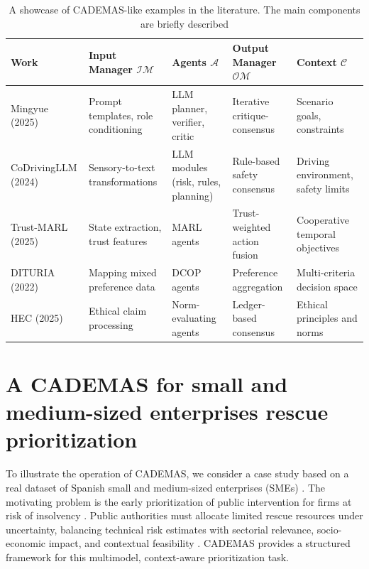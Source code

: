 \documentclass[letterpaper, 10 pt,conference]{IEEEconf}
\begin{document}
\begin{table}[h!]
\centering
\renewcommand{\arraystretch}{1.3}
\caption{A showcase of CADEMAS-like examples in the literature. The main components are briefly described}
\label{tab:cademas_mapping}
\begin{tabular}{|p{3.2cm}|p{3.2cm}|p{3.2cm}|p{3.2cm}|p{3.2cm}|}
\hline
\textbf{Work} & \textbf{Input Manager $\mathcal{IM}$} & \textbf{Agents $\mathcal{A}$} & \textbf{Output Manager $\mathcal{OM}$} & \textbf{Context $\mathcal{C}$} \\
\hline
Mingyue (2025) \cite{Cai2025} & Prompt templates, role conditioning & LLM planner, verifier, critic & Iterative critique-consensus & Scenario goals, constraints \\
\hline
CoDrivingLLM (2024) \cite{CoDrivingLLM} & Sensory-to-text transformations & LLM modules (risk, rules, planning) & Rule-based safety consensus & Driving environment, safety limits \\
\hline
Trust-MARL (2025) \cite{Trust-MARL2025} & State extraction, trust features & MARL agents & Trust-weighted action fusion & Cooperative temporal objectives \\
\hline
DITURIA (2022) \cite{dituria2022}& Mapping mixed preference data & DCOP agents & Preference aggregation & Multi-criteria decision space \\
\hline
HEC (2025) \cite{HECframework} & Ethical claim processing & Norm-evaluating agents & Ledger-based consensus & Ethical principles and norms \\
\hline
\end{tabular}
\end{table}

\section{A CADEMAS for small and medium-sized enterprises rescue prioritization\label{sect:smes}}

To illustrate the operation of CADEMAS, we consider a case study based on a real dataset of Spanish small and medium-sized enterprises (SMEs) \cite{NavarroGalera2025}. The motivating problem is the early prioritization of public intervention for firms at risk of insolvency \cite{NavarroGalera2025}. Public authorities must allocate limited rescue resources under uncertainty, balancing technical risk estimates with sectorial relevance, socio-economic impact, and contextual feasibility \cite{PerezCanedo2022}. CADEMAS provides a structured framework for this multimodel, context-aware prioritization task.
\end{document}
